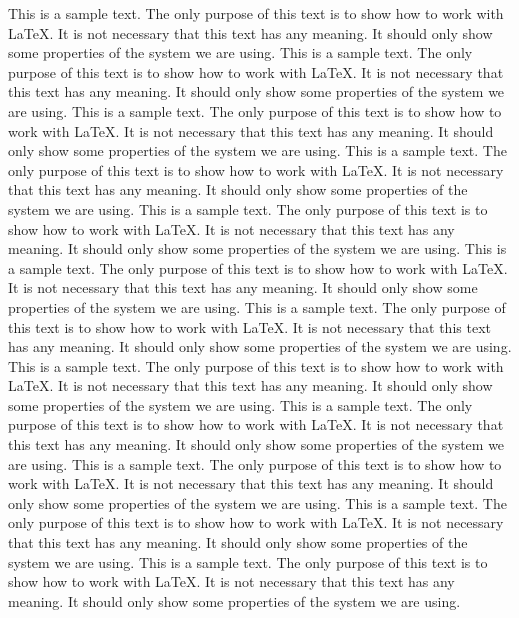 \documentclass[10pt, paper=a4, abstracton]{scrartcl}
\begin{document}
This is a sample text. The only purpose of this text is to show how to work with \LaTeX . It is not necessary that this text has any meaning. It should only show some properties of the system we are using. This is a sample text. The only purpose of this text is to show how to work with \LaTeX . It is not necessary that this text has any meaning. It should only show some properties of the system we are using. This is a sample text. The only purpose of this text is to show how to work with \LaTeX . It is not necessary that this text has any meaning. It should only show some properties of the system we are using. This is a sample text. The only purpose of this text is to show how to work with \LaTeX . It is not necessary that this text has any meaning. It should only show some properties of the system we are using. This is a sample text. The only purpose of this text is to show how to work with \LaTeX . It is not necessary that this text has any meaning. It should only show some properties of the system we are using. This is a sample text. The only purpose of this text is to show how to work with \LaTeX . It is not necessary that this text has any meaning. It should only show some properties of the system we are using. This is a sample text. The only purpose of this text is to show how to work with \LaTeX . It is not necessary that this text has any meaning. It should only show some properties of the system we are using. This is a sample text. The only purpose of this text is to show how to work with \LaTeX . It is not necessary that this text has any meaning. It should only show some properties of the system we are using. This is a sample text. The only purpose of this text is to show how to work with \LaTeX . It is not necessary that this text has any meaning. It should only show some properties of the system we are using. This is a sample text. The only purpose of this text is to show how to work with \LaTeX . It is not necessary that this text has any meaning. It should only show some properties of the system we are using. This is a sample text. The only purpose of this text is to show how to work with \LaTeX . It is not necessary that this text has any meaning. It should only show some properties of the system we are using. This is a sample text. The only purpose of this text is to show how to work with \LaTeX . It is not necessary that this text has any meaning. It should only show some properties of the system we are using. 
\end{document}
